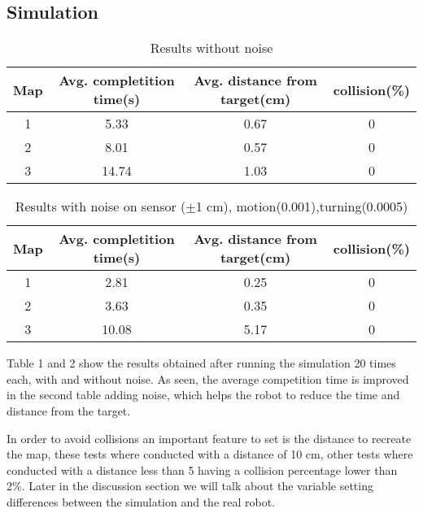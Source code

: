 \subsection{Simulation}
\begin{table}[h]
\begin{center}
	\begin{tabular}{ |c|c|c|c| }
		\hline
		Map & \multicolumn{1}{|p{3cm}|}{\centering Avg. completition time(s) } &\multicolumn{1}{|p{3cm}|}{\centering Avg. distance from target(cm) }  & collision(\%)  \\ 
		\hline
		\hline
		1 & 5.33 & 0.67 & 0 \\  
		2 & 8.01 & 0.57 & 0 \\ 
		3 & 14.74 & 1.03 & 0 \\ 
		\hline 
	\end{tabular}
	\caption{Results without noise}
	\label{table:nonoise}
\end{center}
\end{table}

\begin{table}[h]
\begin{center}
	\begin{tabular}{ |c|c|c|c| }
		\hline
		Map & \multicolumn{1}{|p{3cm}|}{\centering Avg. completition time(s) } &\multicolumn{1}{|p{3cm}|}{\centering Avg. distance from target(cm) }  & collision(\%)  \\ 
		\hline
		\hline
		1 & 2.81 & 0.25  & 0 \\  
		2 & 3.63 & 0.35  & 0 \\ 
		3 & 10.08 & 5.17  & 0 \\ 
		\hline 
	\end{tabular}
	\label{table:noise}
	\caption{Results with noise on sensor ($\pm$1 cm), motion(0.001),turning(0.0005)}
\end{center}
\end{table}

Table 1 and 2 show the results obtained after running the simulation 20 times each, with and without noise. As seen, the average competition time is improved in the second table adding noise, which helps the robot to reduce the time and distance from the target. 

In order to avoid collisions an important feature to set is the distance to recreate the map, these tests where conducted with a distance of 10 cm, other tests where conducted with a distance less than 5 having a collision percentage lower than 2\%. Later in the discussion section we will talk about the variable setting differences between the simulation and the real robot. 

\FloatBarrier